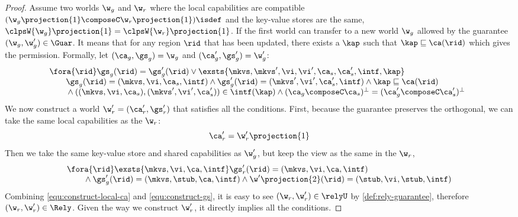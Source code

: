 \begin{proof}
Assume two worlds \( \w_g \) and \( \w_r \) where the local capabilities are compatible \((\w_g\projection{1} \composeC \w_r\projection{1})\isdef\) and the key-value stores are the same, \ie \( \clpsW{\w_g}\projection{1} = \clpsW{\w_r}\projection{1} \).
If the first world can transfer to a new world \( \w_g \) allowed by the guarantee \( (\w_g, \w_g' ) \in \Guar \).
It means that for any region \( \rid \) that has been updated, there exists a \( \kap \) such that \( \kap \sqsubseteq \ca(\rid) \) which gives the permission.
Formally, let \( (\ca_g, \gs_g) = \w_g \) and \( (\ca_g', \gs_g') = \w_g' \):
\[
\begin{array}{@{}l}
    \fora{\rid} 
    \gs_g(\rid) = \gs_g'(\rid) \lor 
    \exsts{\mkvs, \mkvs', \vi, \vi', \ca_s, \ca_{s}', \intf, \kap} \\
    \qquad \gs_g(\rid) = (\mkvs, \vi, \ca_{s}, \intf) 
    \land \gs_g'(\rid) = (\mkvs', \vi', \ca_{s}', \intf)
    \land \kap \sqsubseteq \ca(\rid) \\
    \qquad {} \land ((\mkvs, \vi, \ca_{s}), (\mkvs', \vi', \ca_{s}')) \in \intf(\kap)
    \land (\ca_g \composeC \ca_s)^{\perp} = (\ca_g' \composeC \ca_s')^{\perp}
\end{array} 
\]
We now construct a world \( \w_r' = (\ca_r', \gs_r') \) that satisfies all the conditions.
First, because the guarantee preserves the orthogonal, we can take the same local capabilities as the \( \w_r \):
\begin{equation}
\label{equ:construct-local-ca}
    \ca_r' = \w_r'\projection{1}
\end{equation}
Then we take the same key-value store and shared capabilities as \( \w_g' \), but keep the view as the same in the \( \w_r \),
\begin{equation}
\label{equ:construct-gs}
\begin{array}{l}
    \fora{\rid} \exsts{\mkvs,\vi,\ca,\intf} \gs_r'(\rid) = (\mkvs, \vi, \ca, \intf) \\
    \qquad {} \land \gs_g'(\rid) = (\mkvs, \stub, \ca, \intf) \land \w'\projection{2}(\rid) = (\stub, \vi, \stub, \intf)
\end{array}
\end{equation}
Combining \cref{equ:construct-local-ca} and \cref{equ:construct-gs}, it is easy to see \( ( \w_r, \w_r' ) \in \relyU \) by \cref{def:rely-guarantee}, therefore \( ( \w_r, \w_r' ) \in \Rely \).
Given the way we construct \( \w_r' \), it directly implies all the conditions.
\end{proof}


